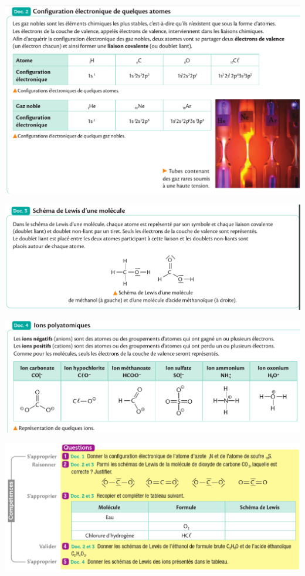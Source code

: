 \documentclass[10pt]{article}
\begin{document}
\begin{center}
	\includegraphics[scale=0.3]{assets/doc2.png}



	\includegraphics[scale=0.2]{assets/doc3.png}
	\vspace{10pt}



	\includegraphics[scale=0.2]{assets/doc4.png}
	\vspace{10pt}

	\includegraphics[scale=0.3]{assets/q.png}
\end{center}
\end{document}
